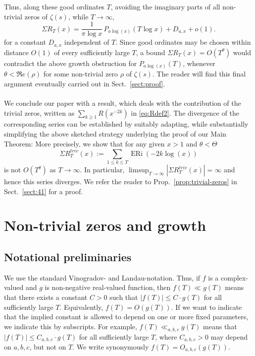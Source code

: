 \documentclass[a4paper,10pt]{amsart}
\DeclareMathOperator{\ERi}{ERi}
\theoremstyle{definition}
\numberwithin{equation}{section}
\begin{document}
Thus, along these good ordinates $T$, avoiding the imaginary parts of all non-trivial zeros of $\zeta(s)$, while $T\to\infty$, 
$$
\Sigma R_T(x) = \frac{1}{\pi\log x}\,P_{a\log(x)}(T\log x)+D_{a,x}+o(1).
$$
for a constant $D_{a,x}$ independent of $T$. Since good ordinates may be chosen within distance $O(1)$ of every sufficiently large $T$, a bound $\Sigma R_T(x) =O(T^\theta)$ would contradict the above growth obstruction for $P_{a\log(x)}(T)$, whenever $\theta<\Re e(\rho)$ for some non-trivial zero $\rho$ of $\zeta(s)$. The reader will find this final argument eventually carried out in Sect.\ \ref{sect:proof}.\\\\
We conclude our paper with a result, which deals with the contribution of the trivial zeros, written as $\sum_{k\geq 1} R(x^{-2k})$ in \eqref{eq:Rdef2}. The divergence of the corresponding series can be established by suitably adapting, while substantially simplifying the above sketched strategy underlying the proof of our Main Theorem: More precisely, we show that for any given $x>1$ and $\theta<\Theta$ 
$$\Sigma R^{triv}_T(x):=\sum_{1\leq k\leq T} \ERi(-2k\log(x))$$
is not $O(T^\theta)$ as $T\to\infty$. In particular, $\limsup_{T\to\infty}|\Sigma R^{triv}_T(x)|=\infty$ and hence this series diverges. We refer the reader to Prop.\ \ref{prop:trivial-zeros} in Sect.\ \ref{sect:41} for a proof.%




\section{Non-trivial zeros and growth}
\subsection{Notational preliminaries}
We use the standard Vinogradov- and Landau-notation. Thus, if $f$ is a complex-valued and $g$ is non-negative real-valued function, then $f(T)\ll g(T)$ means that there exists a constant $C>0$ such that $|f(T)|\le C\cdot g(T)$ for all sufficiently large $T$. Equivalently, $f(T)=O(g(T))$. If we want to indicate that the implied constant is allowed to depend on one or more fixed parameters, we indicate this by subscripts. For example, $f(T)\ll_{a,b,c} g(T)$ means that $|f(T)|\le C_{a,b,c}\cdot g(T)$ for all sufficiently large $T$, where $C_{a,b,c}>0$ may depend on ${a,b,c}$, but not on $T$. We write synonymously $f(T)=O_{a,b,c}(g(T))$.
\end{document}
